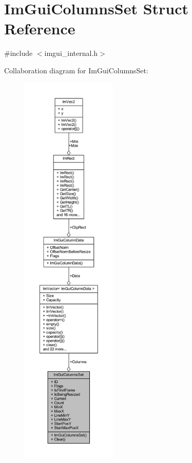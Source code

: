 \hypertarget{struct_im_gui_columns_set}{}\section{Im\+Gui\+Columns\+Set Struct Reference}
\label{struct_im_gui_columns_set}


{\ttfamily \#include $<$imgui\+\_\+internal.\+h$>$}



Collaboration diagram for Im\+Gui\+Columns\+Set\+:
\nopagebreak
\begin{figure}[H]
\begin{center}
\leavevmode
\includegraphics[height=550pt]{struct_im_gui_columns_set__coll__graph}
\end{center}
\end{figure}
